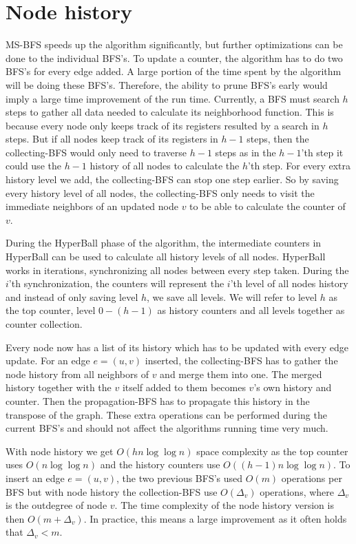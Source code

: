 \section{Node history}

MS-BFS speeds up the algorithm significantly, but further optimizations can be done to the individual BFS's. To update a counter, the algorithm has to do two BFS's for every edge added. A large portion of the time spent by the algorithm will be doing these BFS's. Therefore, the ability to prune BFS's early would imply a large time improvement of the run time. Currently, a BFS must search $h$ steps to gather all data needed to calculate its neighborhood function. This is because every node only keeps track of its registers resulted by a search in $h$ steps. But if all nodes keep track of its registers in $h-1$ steps, then the collecting-BFS would only need to traverse $h-1$ steps as in the $h-1$'th step it could use the $h-1$ history of all nodes to calculate the $h$'th step. For every extra history level we add, the collecting-BFS can stop one step earlier. So by saving every history level of all nodes, the collecting-BFS only needs to visit the immediate neighbors of an updated node $v$ to be able to calculate the counter of $v$. 

During the HyperBall phase of the algorithm, the intermediate counters in HyperBall can be used to calculate all history levels of all nodes. HyperBall works in iterations, synchronizing all nodes between every step taken. During the $i$'th synchronization, the counters will represent the $i$'th level of all nodes history and instead of only saving level $h$, we save all levels. We will refer to level $h$ as the top counter, level $0 - (h-1)$ as history counters and all levels together as counter collection.  

Every node now has a list of its history which has to be updated with every edge update. For an edge $e = (u,v)$ inserted, the collecting-BFS has to gather the node history from all neighbors of $v$ and merge them into one. The merged history together with the $v$ itself added to them becomes $v$'s own history and counter. Then the propagation-BFS has to propagate this history in the transpose of the graph. These extra operations can be performed during the current BFS's and should not affect the algorithms running time very much.

With node history we get $O(hn \log \log n)$ space complexity as the top counter uses $O(n \log \log n)$ and the history counters use $O((h-1)n \log \log n)$. To insert an edge $e = (u,v)$, the two previous BFS's used $O(m)$ operations per BFS but with node history the collection-BFS use $O(\Delta_v)$ operations, where $\Delta_v$ is the outdegree of node $v$. The time complexity of the node history version is then $O(m + \Delta_v)$. In practice, this means a large improvement as it often holds that $\Delta_v < m$.

